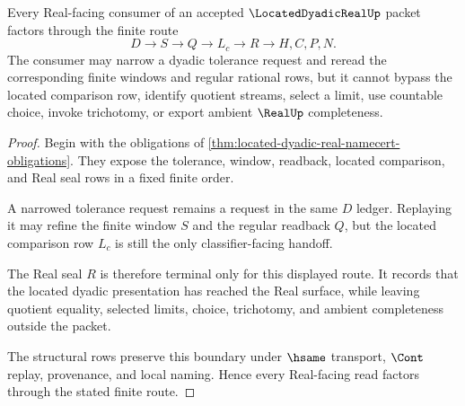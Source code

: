 \begin{theorem}
\label{thm:located-dyadic-real-terminal-seal}
Every Real-facing consumer of an accepted $\LocatedDyadicRealUp$ packet factors through the finite route
$$
D \to S \to Q \to L_c \to R \to H,C,P,N .
$$
The consumer may narrow a dyadic tolerance request and reread the corresponding finite windows and regular rational rows, but it cannot bypass the located comparison row, identify quotient streams, select a limit, use countable choice, invoke trichotomy, or export ambient $\RealUp$ completeness.
\end{theorem}
\begin{proof}
Begin with the obligations of \autoref{thm:located-dyadic-real-namecert-obligations}. They expose the tolerance, window, readback, located comparison, and Real seal rows in a fixed finite order.

A narrowed tolerance request remains a request in the same $D$ ledger. Replaying it may refine the finite window $S$ and the regular readback $Q$, but the located comparison row $L_c$ is still the only classifier-facing handoff.

The Real seal $R$ is therefore terminal only for this displayed route. It records that the located dyadic presentation has reached the Real surface, while leaving quotient equality, selected limits, choice, trichotomy, and ambient completeness outside the packet.

The structural rows preserve this boundary under $\hsame$ transport, $\Cont$ replay, provenance, and local naming. Hence every Real-facing read factors through the stated finite route.
\end{proof}

